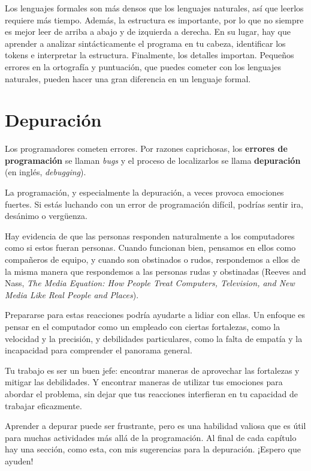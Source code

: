 \documentclass[10pt]{book}
\begin{document}
Los lenguajes formales son más densos
que los lenguajes naturales, así que leerlos requiere más tiempo.  Además, la
estructura es importante, por lo que no siempre es mejor leer
de arriba a abajo y de izquierda a derecha.  En su lugar, hay que aprender a analizar
sintácticamente el programa en tu cabeza, identificar los tokens e interpretar
la estructura.  Finalmente, los detalles importan.  Pequeños errores en
la ortografía y puntuación, que puedes cometer
con los lenguajes naturales, pueden hacer una gran diferencia en un lenguaje
formal.


\section{Depuración}

Los programadores cometen errores.  Por razones caprichosas, los {\bf errores
de programación} se llaman {\em bugs} y el proceso de localizarlos se llama
{\bf depuración} (en inglés, {\em debugging}).

La programación, y especialmente la depuración, a veces provoca emociones
fuertes.  Si estás luchando con un error de programación difícil, podrías
sentir ira, desánimo o vergüenza.

Hay evidencia de que las personas responden naturalmente a los computadores
como si estos fueran personas.  Cuando funcionan bien, pensamos en ellos como
compañeros de equipo, y cuando son obstinados o rudos, respondemos a ellos
de la misma manera que respondemos a las personas rudas
y obstinadas (Reeves and Nass, {\it The Media
    Equation: How People Treat Computers, Television, and New Media
    Like Real People and Places}).

Prepararse para estas reacciones podría ayudarte a lidiar con ellas.
Un enfoque es pensar en el computador como un empleado con
ciertas fortalezas, como la velocidad y la precisión, y
debilidades particulares, como la falta de empatía y la incapacidad
para comprender el panorama general.

Tu trabajo es ser un buen jefe: encontrar maneras de aprovechar las
fortalezas y mitigar las debilidades.  Y encontrar maneras
de utilizar tus emociones para abordar el problema,
sin dejar que tus reacciones interfieran en tu capacidad
de trabajar eficazmente.

Aprender a depurar puede ser frustrante, pero es una habilidad valiosa
que es útil para muchas actividades más allá de la programación.  Al final
de cada capítulo hay una sección, como esta,
con mis sugerencias para la depuración.  ¡Espero que ayuden!
\end{document}
